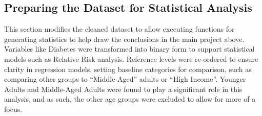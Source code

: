 \documentclass[
]{article}
\begin{document}
\subsection{Preparing the Dataset for Statistical
Analysis}\label{preparing-the-dataset-for-statistical-analysis}

This section modifies the cleaned dataset to allow executing functions
for generating statistics to help draw the conclusions in the main
project above. Variables like Diabetes were transformed into binary form
to support statistical models such as Relative Risk analysis. Reference
levels were re-ordered to ensure clarity in regression models, setting
baseline categories for comparison, such as comparing other groups to
``Middle-Aged'' adults or ``High Income''. Younger Adults and
Middle-Aged Adults were found to play a significant role in this
analysis, and as such, the other age groups were excluded to allow for
more of a focus.
\end{document}
